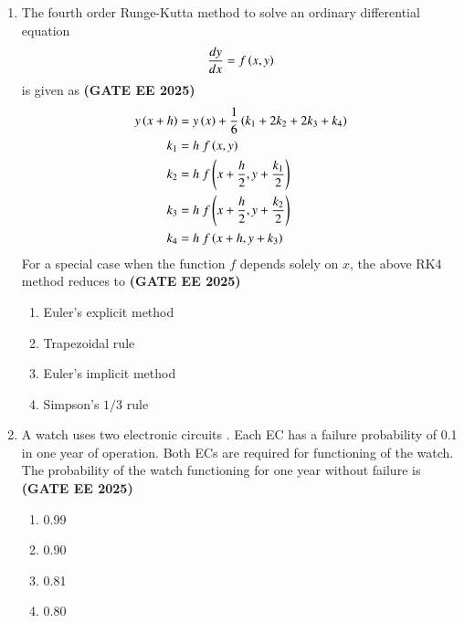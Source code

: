 \documentclass[journal,12pt,onecolumn]{IEEEtran}
\theoremstyle{remark}
\begin{document}
\begin{enumerate}
\item The fourth order Runge-Kutta  method to solve an ordinary differential equation
\[ \frac{dy}{dx}=f\left(x,y\right) \]
is given as \hfill \textbf{(GATE EE 2025)}
\begin{align*}
y\left(x+h\right)&=y\left(x\right)+\frac{1}{6}\left(k_{1}+2k_{2}+2k_{3}+k_{4}\right) \\
k_{1}&=h~f\left(x,y\right) \\
k_{2}&=h~f\left(x+\frac{h}{2},y+\frac{k_{1}}{2}\right) \\
k_{3}&=h~f\left(x+\frac{h}{2},y+\frac{k_{2}}{2}\right) \\
k_{4}&=h~f\left(x+h,y+k_{3}\right)
\end{align*}
For a special case when the function $f$ depends solely on $x$, the above RK4 method reduces to
\hfill \textbf{(GATE EE 2025)} \begin{enumerate}
    \item Euler's explicit method
    \item Trapezoidal rule
    \item Euler's implicit method
    \item Simpson's $1/3$ rule
\end{enumerate}



\item A watch uses two electronic circuits . Each EC has a failure probability of 0.1 in one year of operation. Both ECs are required for functioning of the watch. The probability of the watch functioning for one year without failure is
\hfill \textbf{(GATE EE 2025)} \begin{enumerate}
    \item 0.99
    \item 0.90
    \item 0.81
    \item 0.80
\end{enumerate}



\end{enumerate}
\end{document}
